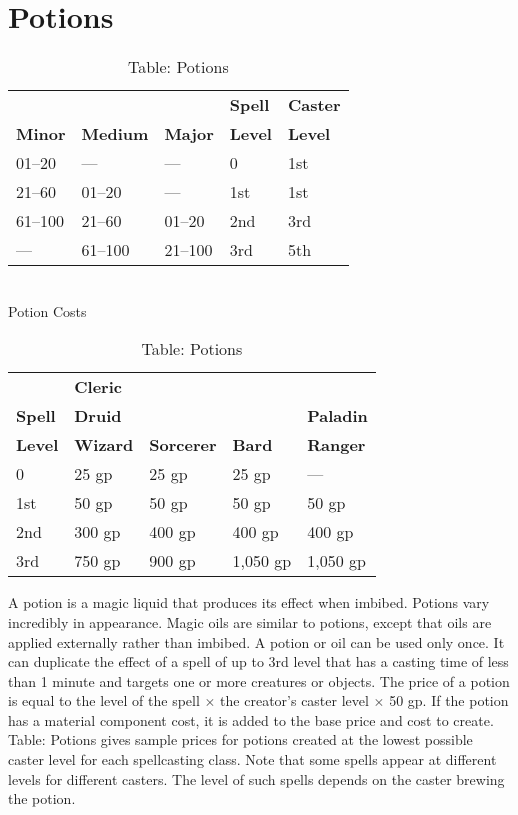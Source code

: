 \section{Potions}

\label{f0}
\begin{table}[]
\sffamily
\caption{Table: Potions}
\begin{tabular}{lllll}
               &                 &                & \textbf{Spell} & \textbf{Caster} \\
\textbf{Minor} & \textbf{Medium} & \textbf{Major} & \textbf{Level} & \textbf{Level}\\
01--20 & --- & --- & 0 & 1st\\
21--60 & 01--20 & --- & 1st & 1st\\
 61--100 & 21--60 & 01--20 & 2nd & 3rd\\
 --- & 61--100 & 21--100 & 3rd & 5th\\
\end{tabular}\\
 \textnormal{Potion Costs}\\
 \begin{tabular}{lllll}
               & \textbf{Cleric} & \\
\textbf{Spell} & \textbf{Druid}  &                   &               & \textbf{Paladin} \\
\textbf{Level} & \textbf{Wizard} & \textbf{Sorcerer} & \textbf{Bard} & \textbf{Ranger} \\
0 & 25 gp & 25 gp & 25 gp & ---\\
1st & 50 gp & 50 gp & 50 gp & 50 gp\\
2nd & 300 gp & 400 gp & 400 gp & 400 gp\\
3rd & 750 gp & 900 gp & 1,050 gp & 1,050 gp\\
 \end{tabular}

\end{table}

				
A potion is a magic liquid that produces its effect when imbibed. Potions vary incredibly in appearance. Magic oils are similar to potions, except that oils are applied externally rather than imbibed. A potion or oil can be used only once. It can duplicate the effect of a spell of up to 3rd level that has a casting time of less than 1 minute and targets one or more creatures or objects. The price of a potion is equal to the level of the spell \mbox{$\times$} the creator's caster level \mbox{$\times$} 50 gp. If the potion has a material component cost, it is added to the base price and cost to create. Table: Potions gives sample prices for potions created at the lowest possible caster level for each spellcasting class. Note that some spells appear at different levels for different casters. The level of such spells depends on the caster brewing the potion.
				
